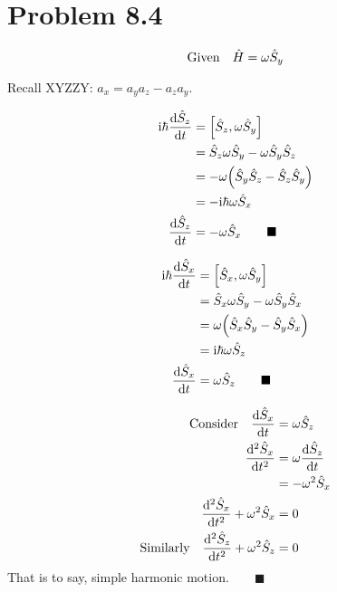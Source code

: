 \documentclass{article}
\begin{document}
\section*{Problem 8.4}

\[\qq*{Given} \hat{H}=\omega \hat{S}_y \] 

Recall XYZZY: $a_x=a_y a_z - a_z a_y$.

\begin{align*}
\text{i}\hbar\dv{\hat{S}_{z} }{t}&= \qty[\hat{S}_{z} ,\omega \hat{S}_y]\\
&=\hat{S}_{z}\omega \hat{S}_y-\omega \hat{S}_y \hat{S}_{z}\\
&=-\omega\qty(\hat{S}_y \hat{S}_{z}-\hat{S}_{z} \hat{S}_y)\\
&=-\text{i}\hbar\omega\hat{S}_x\\
\dv{\hat{S}_{z} }{t}&=-\omega\hat{S}_x\qquad\blacksquare 
\end{align*}

\begin{align*}
\text{i}\hbar\dv{\hat{S}_{x} }{t}&= \qty[\hat{S}_{x} ,\omega \hat{S}_y]\\
&=\hat{S}_{x}\omega \hat{S}_y-\omega \hat{S}_y \hat{S}_{x}\\
&=\omega\qty(\hat{S}_{x} \hat{S}_y-\hat{S}_y \hat{S}_{x})\\
&=\text{i}\hbar\omega\hat{S}_z\\
\dv{\hat{S}_{x} }{t}&=\omega\hat{S}_z\qquad\blacksquare 
\end{align*}


\begin{align*}
\qq*{Consider} \dv{\hat{S}_{x} }{t}&= \omega\hat{S}_z\\ 
\dv[2]{\hat{S}_{x} }{t}&= \omega\dv{\hat{S}_z}{t}\\ 
&= -\omega^2 \hat{S}_x\\
\dv[2]{\hat{S}_{x} }{t}+\omega^2 \hat{S}_x&=0\\
\qq*{Similarly}\dv[2]{\hat{S}_{z} }{t}+\omega^2 \hat{S}_z&=0
\end{align*}
That is to say, simple harmonic motion.$\qquad\blacksquare $ 
\end{document}
